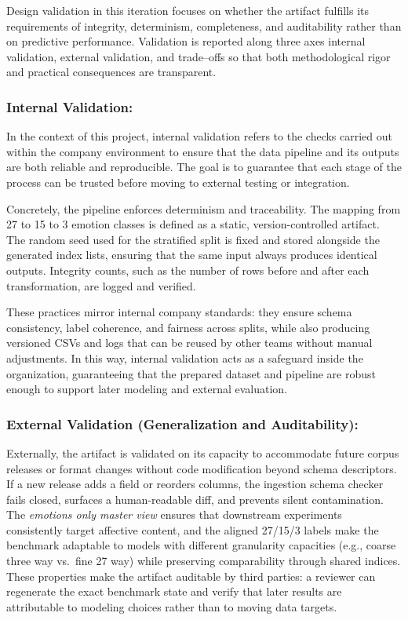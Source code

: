Design validation in this iteration focuses on whether the artifact fulfills its requirements of integrity, determinism, completeness, and auditability rather than on predictive performance. Validation is reported along three axes internal validation, external validation, and trade--offs so that both methodological rigor and practical consequences are transparent.

\subsubsection*{Internal Validation:}

In the context of this project, internal validation refers to the checks carried out within the company environment to ensure that the data pipeline and its outputs are both reliable and reproducible. The goal is to guarantee that each stage of the process can be trusted before moving to external testing or integration.

\noindent Concretely, the pipeline enforces determinism and traceability. The mapping from 27 to 15 to 3 emotion classes is defined as a static, version-controlled artifact. The random seed used for the stratified split is fixed and stored alongside the generated index lists, ensuring that the same input always produces identical outputs. Integrity counts, such as the number of rows before and after each transformation, are logged and verified. 

\noindent These practices mirror internal company standards: they ensure schema consistency, label coherence, and fairness across splits, while also producing versioned CSVs and logs that can be reused by other teams without manual adjustments. In this way, internal validation acts as a safeguard inside the organization, guaranteeing that the prepared dataset and pipeline are robust enough to support later modeling and external evaluation.


\subsubsection*{External Validation (Generalization and Auditability):}
Externally, the artifact is validated on its capacity to accommodate future corpus releases or format changes without code modification beyond schema descriptors. If a new release adds a field or reorders columns, the ingestion schema checker fails closed, surfaces a human-readable diff, and prevents silent contamination. The \emph{emotions only master view} ensures that downstream experiments consistently target affective content, and the aligned 27/15/3 labels make the benchmark adaptable to models with different granularity capacities (e.g., coarse three way vs.\ fine 27 way) while preserving comparability through shared indices. These properties make the artifact auditable by third parties: a reviewer can regenerate the exact benchmark state and verify that later results are attributable to modeling choices rather than to moving data targets.

